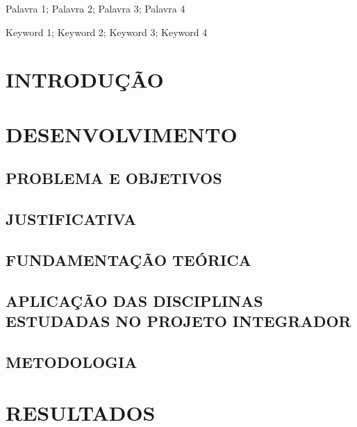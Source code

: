 \documentclass[a4paper,openright, oneside, article, 12pt, brazil]{abntex2}
\begin{document}
\imprimircapa

\imprimirfolhaderosto

\imprimirresumo
{}
{Palavra 1; Palavra 2; Palavra 3; Palavra 4}

\imprimirabstract
{}
{Keyword 1; Keyword 2; Keyword 3; Keyword 4}
	
\newpage
\listoffigures*

\newpage
\tableofcontents*

\textual

\pagestyle{fancy}
\fancyhf{}
\fancyhead[R]{\thepage}
\fancyhead[L]{\nouppercase{\rightmark}}

\newpage
\section{INTRODUÇÃO}


\newpage
\section{DESENVOLVIMENTO}

\subsection{PROBLEMA E OBJETIVOS}


\subsection{JUSTIFICATIVA}


\subsection{FUNDAMENTAÇÃO TEÓRICA}


\subsection{APLICAÇÃO DAS DISCIPLINAS ESTUDADAS NO PROJETO INTEGRADOR}


\subsection{METODOLOGIA}


\newpage
\section{RESULTADOS}
\end{document}
